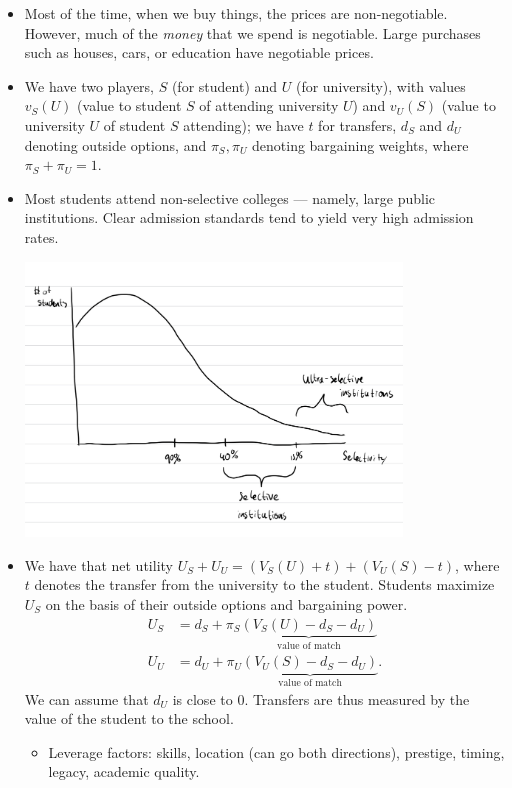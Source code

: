 \documentclass[10pt]{extarticle}
\begin{document}
\begin{itemize}
    \item Most of the time, when we buy things, the prices are non-negotiable. However, much of the \textit{money} that we spend is negotiable. Large purchases such as houses, cars, or education have negotiable prices.
    \item We have two players, $S$ (for student) and $U$ (for university), with values $v_S(U)$ (value to student $S$ of attending university $U$) and $v_U(S)$ (value to university $U$ of student $S$ attending); we have $t$ for transfers, $d_S$ and $d_U$ denoting outside options, and $\pi_S,\pi_U$ denoting bargaining weights, where $\pi_S + \pi_U = 1$.
    \item Most students attend non-selective colleges --- namely, large public institutions. Clear admission standards tend to yield very high admission rates.
      \begin{center}
        \includegraphics[width=10cm]{images/selectivity_and_enrollment.jpeg}
      \end{center}
    \item We have that net utility $U_S + U_U = (V_S(U) + t) + (V_U(S) - t)$, where $t$ denotes the transfer from the university to the student. Students maximize $U_S$ on the basis of their outside options and bargaining power.
      \begin{align*}
        U_S &= d_S + \pi_S\underbrace{(V_S(U) - d_S - d_U)}_{\text{value of match}}\\
        U_U &= d_U + \pi_U\underbrace{(V_U(S) - d_S - d_U)}_{\text{value of match}}.
      \end{align*}
      We can assume that $d_U$ is close to $0$. Transfers are thus measured by the value of the student to the school.
      \begin{itemize}
        \item Leverage factors: skills, location (can go both directions), prestige, timing, legacy, academic quality.
      \end{itemize}
  \end{itemize}
\end{document}
